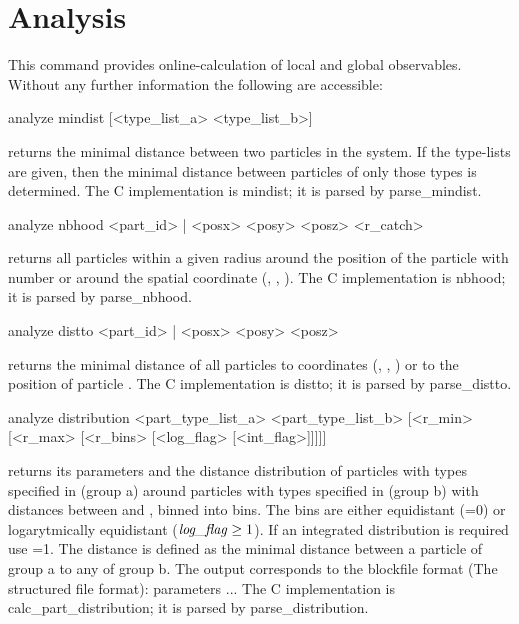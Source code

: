 \chapter{Analysis}
\label{chap:analysis}




This command provides online-calculation of local and global observables.
Without any further information the following are accessible:

\begin{tclcode}
 analyze mindist [<type_list_a> <type_list_b>]
\end{tclcode}
returns the minimal distance between two particles in the system. If the type-lists are given, then the minimal distance between particles of only those types is determined. The C implementation is mindist; it is parsed by parse\_mindist.
\begin{tclcode}
 analyze nbhood { <part_id> | <posx> <posy> <posz> } <r_catch> 
\end{tclcode}
returns all particles within a given radius  around the position of the particle with number  or around the spatial coordinate (, , ). The C implementation is nbhood; it is parsed by parse\_nbhood.

\begin{tclcode}
 analyze distto { <part_id> | <posx> <posy> <posz> } 
\end{tclcode}
returns the minimal distance of all particles to coordinates (, , ) or to the position of particle . The C implementation is distto; it is parsed by parse\_distto.

\begin{tclcode}
 analyze distribution { <part_type_list_a> } { <part_type_list_b> }
[<r_min> [<r_max> [<r_bins> [<log_flag> [<int_flag>]]]]] 
\end{tclcode}
returns its parameters and the distance distribution of particles with types specified in  (group a) around particles with types specified in  (group b) with distances between  and , binned into  bins. The bins are either equidistant (=0) or logarytmically equidistant ($\mbox{\textrm{\textit{log\_flag}}} \geq 1$). If an integrated distribution is required use =1. The distance is defined as the minimal distance between a particle of group a to any of group b. The output corresponds to the blockfile format (The structured file format):
{ parameters } { {   } ... }
 The C implementation is calc\_part\_distribution; it is parsed by parse\_distribution.

